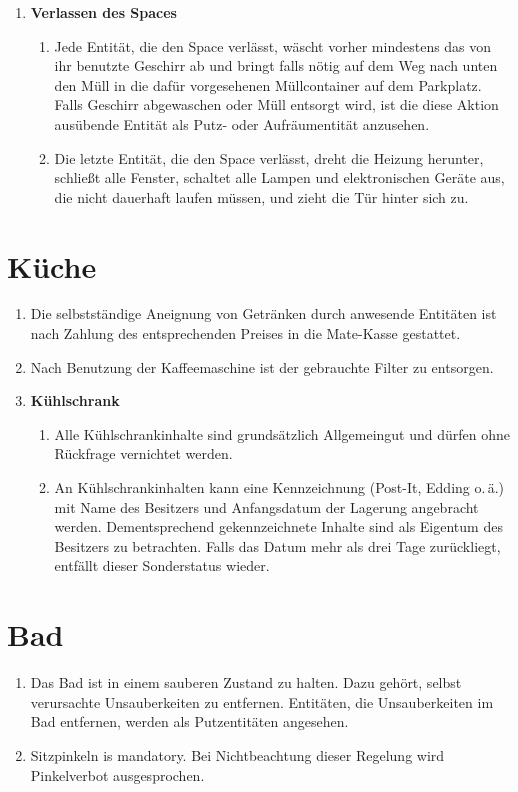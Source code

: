 \documentclass[12pt,a4paper]{scrartcl}
\begin{document}
\begin{enumerate}
  \item\textbf{Verlassen des Spaces}\begin{enumerate}
    \item Jede Entität, die den Space verlässt, wäscht vorher mindestens das von
      ihr benutzte Geschirr ab und bringt falls nötig auf dem Weg nach unten den
      Müll in die dafür vorgesehenen Müllcontainer auf dem Parkplatz. Falls
      Geschirr abgewaschen oder Müll entsorgt wird, ist die diese Aktion
      ausübende Entität als Putz- oder Aufräumentität anzusehen.
    \item Die letzte Entität, die den Space verlässt, dreht die Heizung
      herunter, schließt alle Fenster, schaltet alle Lampen und elektronischen
      Geräte aus, die nicht dauerhaft laufen müssen, und zieht die Tür hinter
      sich zu.
  \end{enumerate}
\end{enumerate}

\section{Küche}
\begin{enumerate}
  \item Die selbstständige Aneignung von Getränken durch anwesende Entitäten ist
    nach Zahlung des entsprechenden Preises in die Mate-Kasse gestattet.
  \item Nach Benutzung der Kaffeemaschine ist der gebrauchte Filter zu
    entsorgen.
  \item\textbf{Kühlschrank}\begin{enumerate}
    \item Alle Kühlschrankinhalte sind grundsätzlich Allgemeingut und dürfen
      ohne Rückfrage vernichtet werden.
    \item An Kühlschrankinhalten kann eine Kennzeichnung (Post-It, Edding
      o.\,ä.) mit Name des Besitzers und Anfangsdatum der Lagerung
      angebracht werden. Dementsprechend gekennzeichnete Inhalte sind als
      Eigentum des Besitzers zu betrachten. Falls das Datum mehr als drei Tage
      zurückliegt, entfällt dieser Sonderstatus wieder.
  \end{enumerate}
\end{enumerate}

\section{Bad}
\begin{enumerate}
  \item Das Bad ist in einem sauberen Zustand zu halten. Dazu gehört, selbst
    verursachte Unsauberkeiten zu entfernen. Entitäten, die Unsauberkeiten im
    Bad entfernen, werden als Putzentitäten angesehen.

  \item Sitzpinkeln is mandatory. Bei Nichtbeachtung dieser Regelung wird
    Pinkelverbot ausgesprochen.
\end{enumerate}
\end{document}
